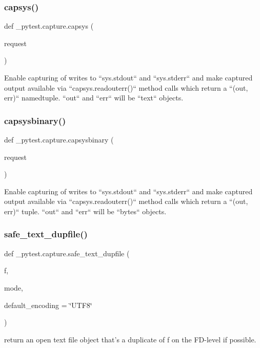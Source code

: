 \subsubsection{\texorpdfstring{capsys()}{capsys()}}
{\footnotesize\ttfamily def \+\_\+pytest.\+capture.\+capsys (\begin{DoxyParamCaption}\item[{}]{request }\end{DoxyParamCaption})}

\begin{DoxyVerb}Enable capturing of writes to ``sys.stdout`` and ``sys.stderr`` and make
captured output available via ``capsys.readouterr()`` method calls
which return a ``(out, err)`` namedtuple.  ``out`` and ``err`` will be ``text``
objects.
\end{DoxyVerb}
 \mbox{\label{namespace__pytest_1_1capture_ae1f2a75a93becc62b712162e84b6e955}} 
\subsubsection{\texorpdfstring{capsysbinary()}{capsysbinary()}}
{\footnotesize\ttfamily def \+\_\+pytest.\+capture.\+capsysbinary (\begin{DoxyParamCaption}\item[{}]{request }\end{DoxyParamCaption})}

\begin{DoxyVerb}Enable capturing of writes to ``sys.stdout`` and ``sys.stderr`` and make
captured output available via ``capsys.readouterr()`` method calls
which return a ``(out, err)`` tuple.  ``out`` and ``err`` will be ``bytes``
objects.
\end{DoxyVerb}
 \mbox{\label{namespace__pytest_1_1capture_a5cbb0426ce1caa95e8c8951c408e3a6b}} 
\subsubsection{\texorpdfstring{safe\+\_\+text\+\_\+dupfile()}{safe\_text\_dupfile()}}
{\footnotesize\ttfamily def \+\_\+pytest.\+capture.\+safe\+\_\+text\+\_\+dupfile (\begin{DoxyParamCaption}\item[{}]{f,  }\item[{}]{mode,  }\item[{}]{default\+\_\+encoding = {\ttfamily \char`\"{}UTF8\char`\"{}} }\end{DoxyParamCaption})}

\begin{DoxyVerb}return an open text file object that's a duplicate of f on the
    FD-level if possible.
\end{DoxyVerb}
 